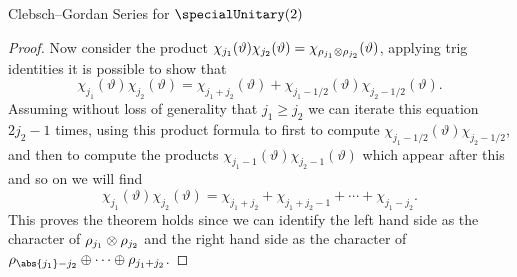 \begin{thm}{Clebsch--Gordan Series for \(\specialUnitary(2)\)}{}
\begin{proof}
        Now consider the product \(\chi_{j_1}(\vartheta)\chi_{j_2}(\vartheta) = \chi_{\rho_{j_1} \otimes \rho_{j_2}}(\vartheta)\), applying trig identities it is possible to show that
        \begin{equation}
            \chi_{j_1}(\vartheta)\chi_{j_2}(\vartheta) = \chi_{j_1 + j_2}(\vartheta) + \chi_{j_1 - 1/2}(\vartheta) \chi_{j_2 - 1/2}(\vartheta).
        \end{equation}
        Assuming without loss of generality that \(j_1 \ge j_2\) we can iterate this equation \(2j_2 - 1\) times, using this product formula to first to compute \(\chi_{j_1 - 1/2}(\vartheta)\chi_{j_2 - 1/2}\), and then to compute the products \(\chi_{j_1 - 1}(\vartheta)\chi_{j_2 - 1}(\vartheta)\) which appear after this and so on we will find
        \begin{equation}
            \chi_{j_1}(\vartheta)\chi_{j_2}(\vartheta) = \chi_{j_1 + j_2} + \chi_{j_1 + j_2 - 1} + \dotsb + \chi_{j_1 - j_2}.
        \end{equation}
        This proves the theorem holds since we can identify the left hand side as the character of \(\rho_{j_1}\otimes \rho_{j_2}\) and the right hand side as the character of \(\rho_{\abs{j_1} - j_2} \directsum \dotsb \directsum \rho_{j_1 + j_2}\).
    \end{proof}
\end{thm}


